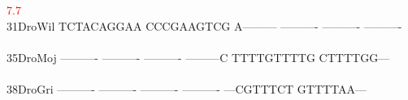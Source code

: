 \documentclass[11pt,twoside,reqno,a4paper]{article}
\begin{document}
{\hspace*{5\charwidth}\hspace*{7\charwidth}\hspace*{0\charwidth}\textcolor{red}{7.7}\hspace*{1\charwidth}\hspace*{1\charwidth}\hspace*{1\charwidth}\hspace*{1\charwidth}\hspace*{1\charwidth}\hspace*{1\charwidth}\\
31\hspace*{3\charwidth}DroWil	TCTACAGGAA	CCCGAAGTCG	A---------	----------	----------	----------	\\
\hspace*{5\charwidth}\hspace*{7\charwidth}\hspace*{1\charwidth}\hspace*{1\charwidth}\hspace*{1\charwidth}\hspace*{1\charwidth}\hspace*{1\charwidth}\hspace*{1\charwidth}\\
35\hspace*{3\charwidth}DroMoj	----------	----------	----------	---------C	TTTTGTTTTG	CTTTTGG---	\\
\hspace*{5\charwidth}\hspace*{7\charwidth}\hspace*{1\charwidth}\hspace*{1\charwidth}\hspace*{1\charwidth}\hspace*{1\charwidth}\hspace*{1\charwidth}\hspace*{1\charwidth}\\
38\hspace*{3\charwidth}DroGri	----------	----------	----------	----------	---CGTTTCT	GTTTTAA---	\\
\hspace*{5\charwidth}\hspace*{7\charwidth}\hspace*{1\charwidth}\hspace*{1\charwidth}\hspace*{1\charwidth}\hspace*{1\charwidth}\hspace*{1\charwidth}\hspace*{1\charwidth}\\
}
\end{document}
